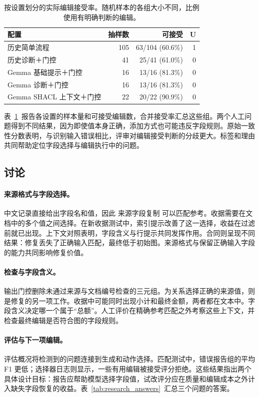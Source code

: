 \begin{table}[t]
\centering
\caption{按设置划分的实际编辑接受率。随机样本的各组大小不同，比例使用有明确判断的编辑。}
\label{tab:human_review_by_config}
\small
\begin{tabular}{lrrr}
\toprule
配置 & 抽样数 & 可接受 & U \\
\midrule
历史简单流程 & 105 & 63/104 (60.6\%) & 1 \\
历史诊断＋门控 & 41 & 25/41 (61.0\%) & 0 \\
Gemma 基础提示＋门控 & 16 & 13/16 (81.3\%) & 0 \\
Gemma 诊断＋门控 & 16 & 13/16 (81.3\%) & 0 \\
Gemma SHACL 上下文＋门控 & 22 & 20/22 (90.9\%) & 0 \\
\bottomrule
\end{tabular}
\end{table}

表~\ref{tab:human_review_by_config}~报告各设置的样本量和可接受编辑数，合并接受率汇总这些组。两个人工问题得到不同结果，因为即使值本身正确，添加方式也可能违反字段规则。原始一致性分数表明，与识别输入错误相比，评审对编辑接受判断的分歧更大。标签和理由共同帮助定位字段选择与编辑执行中的问题。

\subsection{讨论}
\label{sec:eval:failure}

\paragraph{来源格式与字段选择。}
中文记录直接给出字段名和值，因此 来源字段复制 可以匹配参考。收据需要在文档中的多个值之间选择。在新收据测试中，索引提示改善了这一选择，收益在过滤前就已出现。上下文对照表明，字段含义与行提示共同发挥作用。合同则呈现不同结果：修复丢失了正确输入匹配，最终低于初始图。来源格式与保留正确输入字段的能力共同影响修复价值。

\paragraph{检查与字段含义。}
输出门控删除未通过来源与文档编号检查的三元组。为关系选择正确的来源值，则是修复的另一项工作。收据中可能同时出现小计和最终金额，两者都在文本中。字段含义决定哪一个属于“总额”。人工评价在精确参考匹配之外考察这些上下文，并检查最终编辑是否符合图的字段规则。

\paragraph{评估与下一项编辑。}
评估概况将检测到的问题连接到生成和动作选择。匹配测试中，错误报告组的平均 F1 更低；选择器日志则显示，一些有用编辑被接受评分拒绝。这些结果指出两个具体设计目标：报告应帮助模型选择字段值，试改评分应在质量和编辑成本之外计入缺失字段恢复的收益。表~\ref{tab:research_answers}~汇总三个问题的答案。

